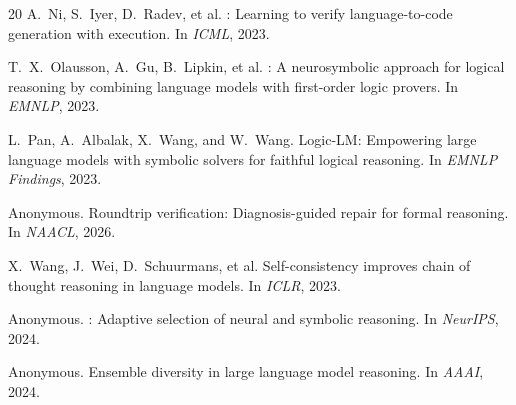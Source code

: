 \documentclass[11pt]{article}
\begin{document}
\begin{thebibliography}{20}
A.~Ni, S.~Iyer, D.~Radev, et al.
: Learning to verify language-to-code generation with execution.
\newblock In \emph{ICML}, 2023.

T.~X.~Olausson, A.~Gu, B.~Lipkin, et al.
: A neurosymbolic approach for logical reasoning by combining language models with first-order logic provers.
\newblock In \emph{EMNLP}, 2023.

L.~Pan, A.~Albalak, X.~Wang, and W.~Wang.
\newblock Logic-{LM}: Empowering large language models with symbolic solvers for faithful logical reasoning.
\newblock In \emph{EMNLP Findings}, 2023.

{Anonymous}.
\newblock Roundtrip verification: Diagnosis-guided repair for formal reasoning.
\newblock In \emph{NAACL}, 2026.

X.~Wang, J.~Wei, D.~Schuurmans, et al.
\newblock Self-consistency improves chain of thought reasoning in language models.
\newblock In \emph{ICLR}, 2023.

{Anonymous}.
: Adaptive selection of neural and symbolic reasoning.
\newblock In \emph{NeurIPS}, 2024.

{Anonymous}.
\newblock Ensemble diversity in large language model reasoning.
\newblock In \emph{AAAI}, 2024.

\end{thebibliography}
\end{document}
